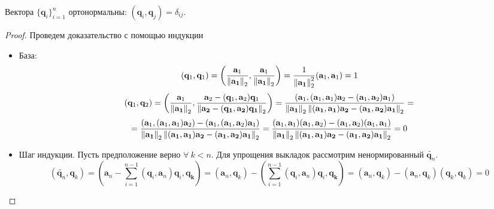 \begin{theorem}
  Вектора $\{\mathbf{q}_i\}_{i=1}^n$ ортонормальны: $(\mathbf{q}_i,\mathbf{q}_j)=\delta_{ij}$.
\end{theorem}
\begin{proof}
  Проведем доказательство с помощью индукции
  \begin{itemize}
    \item База:
          \[(\mathbf{q}_1, \mathbf{q}_1)=\left(\frac{\mathbf{a}_1}{\left\lVert\mathbf{\mathbf{a}_1}\right\rVert_{2}}, \frac{\mathbf{a}_1}{\left\lVert\mathbf{\mathbf{a}_1}\right\rVert_{2}}\right)=\frac{1}{\left\lVert\mathbf{\mathbf{a}_1}\right\rVert_{2}^2}(\mathbf{a}_1,\mathbf{a}_1)=1\]
          \[(\mathbf{q}_1, \mathbf{q}_2)=\left(\frac{\mathbf{a}_1}{\left\lVert\mathbf{\mathbf{a}_1}\right\rVert_{2}}, \frac{\mathbf{a}_2-(\mathbf{q}_1, \mathbf{a}_2)\mathbf{q}_1}{\left\lVert\mathbf{\mathbf{a}_2-(\mathbf{q}_1, \mathbf{a}_2)\mathbf{q}_1}\right\rVert_{2}}\right)=\frac{\left(\mathbf{a}_1, (\mathbf{a}_1,\mathbf{a}_1)\mathbf{a}_2-(\mathbf{a}_1, \mathbf{a}_2)\mathbf{a}_1\right)}{\left\lVert\mathbf{\mathbf{a}_1}\right\rVert_{2}\left\lVert\mathbf{(\mathbf{a}_1,\mathbf{a}_1)\mathbf{a}_2-(\mathbf{a}_1, \mathbf{a}_2)\mathbf{a}_1}\right\rVert_{2}}=\]
          \[=\frac{\left(\mathbf{a}_1, (\mathbf{a}_1,\mathbf{a}_1)\mathbf{a}_2\right)-\left(\mathbf{a}_1, (\mathbf{a}_1, \mathbf{a}_2)\mathbf{a}_1\right)}{\left\lVert\mathbf{\mathbf{a}_1}\right\rVert_{2}\left\lVert\mathbf{(\mathbf{a}_1,\mathbf{a}_1)\mathbf{a}_2-(\mathbf{a}_1, \mathbf{a}_2)\mathbf{a}_1}\right\rVert_{2}}=\frac{(\mathbf{a}_1,\mathbf{a}_1)(\mathbf{a}_1, \mathbf{a}_2)-(\mathbf{a}_1, \mathbf{a}_2)(\mathbf{a}_1, \mathbf{a}_1)}{\left\lVert\mathbf{\mathbf{a}_1}\right\rVert_{2}\left\lVert\mathbf{(\mathbf{a}_1,\mathbf{a}_1)\mathbf{a}_2-(\mathbf{a}_1, \mathbf{a}_2)\mathbf{a}_1}\right\rVert_{2}}=0\]
    \item Шаг индукции. Пусть предположение верно $\forall\ k < n$. Для упрощения выкладок рассмотрим ненормированный $\widetilde{\mathbf{q}_n}$.
          \[(\widetilde{\mathbf{q}_n}, \mathbf{q}_k)=(\mathbf{a}_n-\sum_{i=1}^{n-1}(\mathbf{q}_i, \mathbf{a}_n)\mathbf{q}_i, \mathbf{q_k})=(\mathbf{a}_n,\mathbf{q}_k)-\left(\sum_{i=1}^{n-1}(\mathbf{q}_i, \mathbf{a}_n)\mathbf{q}_i, \mathbf{q_k}\right)=(\mathbf{a}_n,\mathbf{q}_k)-(\mathbf{a}_n,\mathbf{q}_k)(\mathbf{q}_k,\mathbf{q}_k)=0\]
  \end{itemize}
\end{proof}

